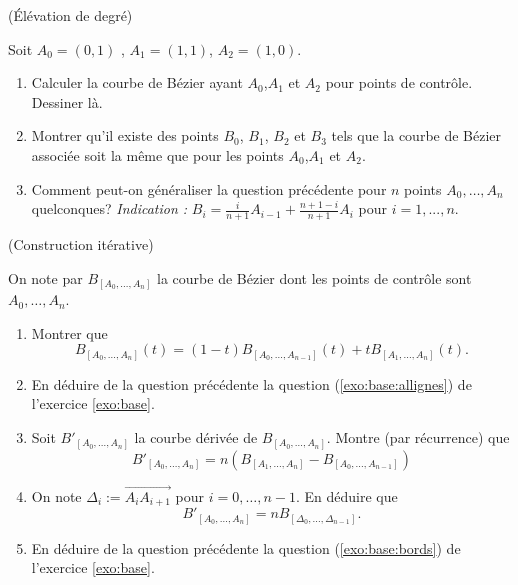 \documentclass[a4paper,12pt,reqno]{amsart}
\begin{document}
\begin{exo}\label{exo:elev} (Élévation de degré)

   Soit $A_{0}=(0,1)$ , $A_{1}=(1,1)$, $A_{2}=(1,0)$.
   \begin{enumerate}
     \item Calculer la courbe de Bézier ayant $A_{0}$,$ A_{1}$ et $A_{2}$ pour points de contrôle. Dessiner là.

     \item Montrer qu'il existe des points $B_{0}$, $B_{1}$, $B_{2}$ et $B_{3}$ tels que la courbe de Bézier associée soit la même que pour les points $A_{0}$,$ A_{1}$ et $A_{2}$.

     \item\label{exo:elev:gen} Comment peut-on généraliser la question précédente pour $n$ points $A_{0},\ldots,A_{n}$ quelconques?
     \textit{Indication :} $B_{i} = \frac{i}{n+1}A_{i-1}+\frac{n+1-i}{n+1}A_{i}$ pour $i=1,...,n$.
   \end{enumerate}

\end{exo}

\begin{exo} (Construction itérative)

  On note par $B_{[A_{0},\ldots,A_{n}]}$ la courbe de Bézier dont les points de contrôle sont $A_{0},\ldots,A_{n}$.
  \begin{enumerate}
    \item Montrer que
    $$
      B_{[A_{0},\ldots,A_{n}]}(t) = (1-t)B_{[A_{0},\ldots,A_{n-1}]}(t) +tB_{[A_{1},\ldots,A_{n}]}(t).
    $$

    \item En déduire de la question précédente la question (\ref{exo:base:allignes}) de l'exercice \ref{exo:base}.

    \item Soit $B'_{[A_{0},\ldots,A_{n}]}$ la courbe dérivée de $B_{[A_{0},\ldots,A_{n}]}$. Montre (par récurrence) que
    $$
      B'_{[A_{0},\ldots,A_{n}]} = n\left(B_{[A_{1},\ldots,A_{n}]} - B_{[A_{0},\ldots,A_{n-1}]}\right)
    $$

    \item On note $\Delta_{i} := \overrightarrow{A_{i}A_{i+1}}$ pour $i=0,\ldots,n-1$. En déduire que
    $$
      B'_{[A_{0},\ldots,A_{n}]} = nB_{[\Delta_{0},\ldots,\Delta_{n-1}]}.
    $$

    \item En déduire de la question précédente la question (\ref{exo:base:bords}) de l'exercice \ref{exo:base}.
  \end{enumerate}
\end{exo}
\end{document}
